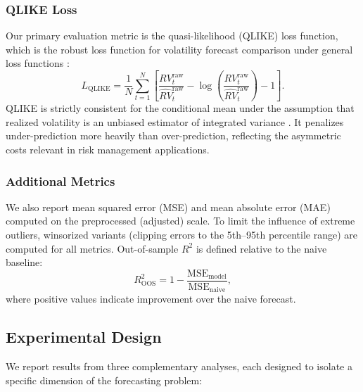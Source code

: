 \subsubsection{QLIKE Loss}
\label{sec:qlike}

Our primary evaluation metric is the quasi-likelihood (QLIKE) loss function, which is the robust loss function for volatility forecast comparison under general loss functions \citep{Patton2011}:
\begin{equation}
    L_{\mathrm{QLIKE}} = \frac{1}{N}\sum_{t=1}^{N} \left[ \frac{RV_t^{\mathrm{raw}}}{\widehat{RV}_t^{\mathrm{raw}}} - \log\!\left(\frac{RV_t^{\mathrm{raw}}}{\widehat{RV}_t^{\mathrm{raw}}}\right) - 1 \right].
    \label{eq:qlike}
\end{equation}
QLIKE is strictly consistent for the conditional mean under the assumption that realized volatility is an unbiased estimator of integrated variance \citep{Patton2011}. It penalizes under-prediction more heavily than over-prediction, reflecting the asymmetric costs relevant in risk management applications.

\subsubsection{Additional Metrics}
\label{sec:additional_metrics}

We also report mean squared error (MSE) and mean absolute error (MAE) computed on the preprocessed (adjusted) scale. To limit the influence of extreme outliers, winsorized variants (clipping errors to the 5th--95th percentile range) are computed for all metrics. Out-of-sample $R^2$ is defined relative to the naive baseline:
\begin{equation}
    R^2_{\mathrm{OOS}} = 1 - \frac{\mathrm{MSE}_{\mathrm{model}}}{\mathrm{MSE}_{\mathrm{naive}}},
    \label{eq:oos_r2}
\end{equation}
where positive values indicate improvement over the naive forecast.

\subsection{Experimental Design}
\label{sec:experimental_design}

We report results from three complementary analyses, each designed to isolate a specific dimension of the forecasting problem:

